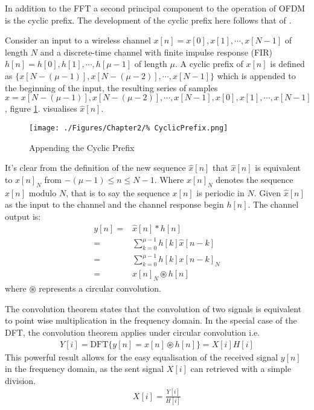 In addition to the FFT a second principal component to the %
operation of OFDM is the cyclic prefix. The development of %
the cyclic prefix here follows that of \cite{Goldsmith05}.

Consider an input to a wireless channel $x[n] = x[0],x[1],\cdots,%
x[N-1]$ of length $N$ and a discrete-time channel with finite %
impulse response (FIR) $h[n] = h[0],h[1],\cdots,h[\mu-1]$ of length %
$\mu$. A cyclic prefix of $x[n]$ is defined as $\{x[N-(\mu-1)], %
x[N-(\mu-2)], \cdots, x[N-1]\}$ which is appended to the beginning %
of the input, the resulting series of samples %
$\hat{x} = x[N-(\mu-1)], %
x[N-(\mu-2)], \cdots, x[N-1], x[0], x[1], \cdots, x[N-1]$, figure %
\ref{fig:CyclicPrefix}. visualises $\hat{x}[n]$.
\begin{figure}[h!]
	\texttt{[image: ./Figures/Chapter2/\%
	CyclicPrefix.png]}
	\caption{Appending the Cyclic Prefix}
	\label{fig:CyclicPrefix}
\end{figure}
It's clear from the definition of the new sequence $\hat{x}[n]$ that %
$\hat{x}[n]$ is equivalent to $x[n]_{N}$ from $-(\mu-1) \leq n \leq %
N-1$. Where $x[n]_{N}$ denotes the sequence $x[n]$ modulo $N$, that %
is to say the sequence $x[n]$ is periodic in $N$. Given $\hat{x}[n]$ %
as the input to the channel and the channel response begin $h[n]$. %
The channel output is:
\begin{align}
	y[n] =& \hat{x}[n]*h[n]\\
	     =& \sum_{k=0}^{\mu-1}h[k]\hat{x}[n-k]\\
	     =& \sum_{k=0}^{\mu-1}h[k]x[n-k]_{N}\\
	     =& x[n]_{N}\circledast h[n]
\end{align}
where $\circledast$ represents a circular convolution. %

The convolution theorem states that the convolution %
of two  signals is equivalent to point wise %
multiplication in the frequency domain\cite{MathWorldConvolution%
Theorem}. In the special case of the DFT, the convolution theorem %
applies under circular convolution i.e.
\begin{align}
	Y[i] = \text{DFT}\{y[n] = x[n]\circledast h[n]\} = X[i]H[i]	
	\label{eq:DFTConvolutionTheorem}
\end{align}
This powerful result allows for the easy equalisation of the %
received %
signal $y[n]$ in the frequency domain, as the sent signal $X[i]$ can %
retrieved with a simple division.
\begin{align}
	X[i] = \frac{Y[i]}{H[i]}
	\label{eq:ZeroForcing}
\end{align}
